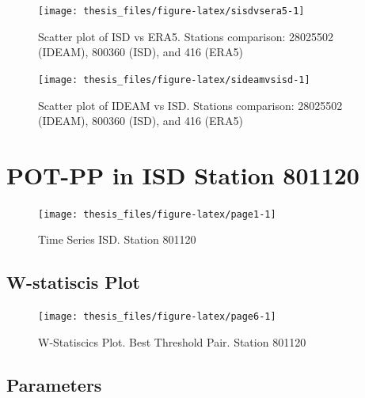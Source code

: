 \documentclass[12pt,oneside]{reedthesis}
\begin{document}
\footnotesize
\begin{figure}

{\centering \texttt{[image: thesis\_files/figure-latex/sisdvsera5-1]} 

}

\caption{Scatter plot of ISD vs ERA5. Stations comparison: 28025502 (IDEAM), 800360 (ISD), and 416 (ERA5)}\label{fig:sisdvsera5}
\end{figure}
\normalsize

\footnotesize
\begin{figure}

{\centering \texttt{[image: thesis\_files/figure-latex/sideamvsisd-1]} 

}

\caption{Scatter plot of IDEAM vs ISD. Stations comparison: 28025502 (IDEAM), 800360 (ISD), and 416 (ERA5)}\label{fig:sideamvsisd}
\end{figure}
\normalsize

\hypertarget{pot-pp-in-isd-station-801120}{%
\section{POT-PP in ISD Station 801120}\label{pot-pp-in-isd-station-801120}}

\footnotesize
\begin{figure}

{\centering \texttt{[image: thesis\_files/figure-latex/page1-1]} 

}

\caption{Time Series ISD. Station 801120}\label{fig:page1}
\end{figure}
\normalsize

\hypertarget{w-statiscis-plot}{%
\subsection{W-statiscis Plot}\label{w-statiscis-plot}}

\footnotesize
\begin{figure}

{\centering \texttt{[image: thesis\_files/figure-latex/page6-1]} 

}

\caption{W-Statiscics Plot. Best Threshold Pair. Station 801120}\label{fig:page6}
\end{figure}
\normalsize

\hypertarget{parameters}{%
\subsection{Parameters}\label{parameters}}
\end{document}
